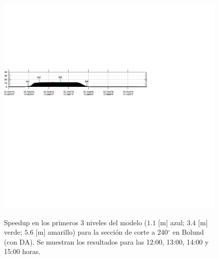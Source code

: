 \begin{figure}[H]
	\includegraphics[width=0.95\linewidth,trim={-11mm 193mm 115mm 112mm},clip]{Imagenes/06/bol_da/cross_height}\\%
	\caption{Speedup en los primeros 3 niveles del modelo ($1.1$ [m] azul; $3.4$ [m] verde; $5.6$ [m] amarillo) para la sección de corte a 240$^\circ$ en Bolund (con DA). Se muestran los resultados para las 12:00, 13:00, 14:00 y 15:00 horas.}
	\label{fig:06_bol_da_speedup}
\end{figure}

